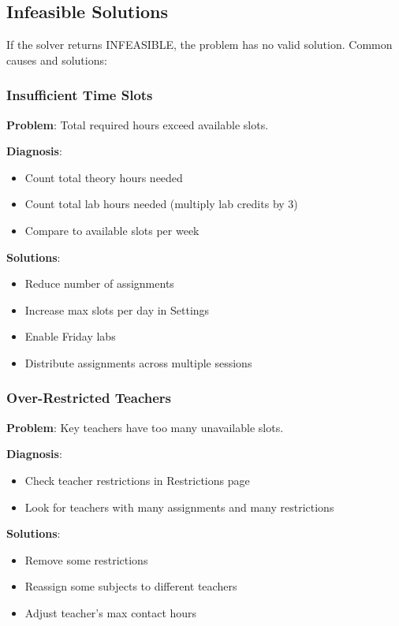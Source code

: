 \documentclass[12pt,a4paper]{article}
\begin{document}
\subsection{Infeasible Solutions}

If the solver returns INFEASIBLE, the problem has no valid solution. Common causes and solutions:

\subsubsection{Insufficient Time Slots}

\textbf{Problem}: Total required hours exceed available slots.

\textbf{Diagnosis}:
\begin{itemize}
\item Count total theory hours needed
\item Count total lab hours needed (multiply lab credits by 3)
\item Compare to available slots per week
\end{itemize}

\textbf{Solutions}:
\begin{itemize}
\item Reduce number of assignments
\item Increase max slots per day in Settings
\item Enable Friday labs
\item Distribute assignments across multiple sessions
\end{itemize}

\subsubsection{Over-Restricted Teachers}

\textbf{Problem}: Key teachers have too many unavailable slots.

\textbf{Diagnosis}:
\begin{itemize}
\item Check teacher restrictions in Restrictions page
\item Look for teachers with many assignments and many restrictions
\end{itemize}

\textbf{Solutions}:
\begin{itemize}
\item Remove some restrictions
\item Reassign some subjects to different teachers
\item Adjust teacher's max contact hours
\end{itemize}
\end{document}
